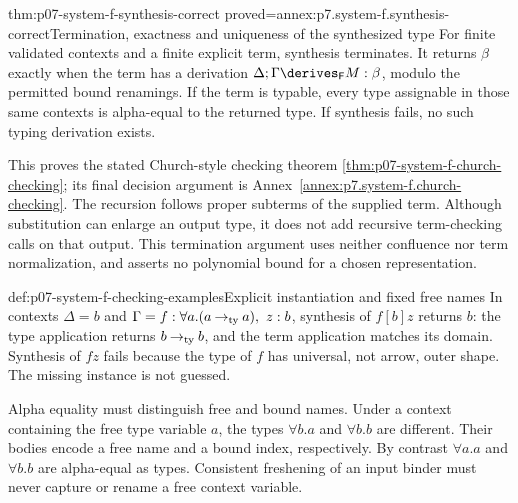 \begin{hbtheorem}{thm:p07-system-f-synthesis-correct}
 {proved=annex:p7.system-f.synthesis-correct}{Termination, exactness and uniqueness of the synthesized type}
For finite validated contexts and a finite explicit term, synthesis
terminates. It returns \(\beta\) exactly when the term has a derivation
\(\Delta;\Gamma\derives_{\mathsf F}M:\beta\), modulo the permitted
bound renamings. If the term is typable, every type assignable in those
same contexts is alpha-equal to the returned type. If synthesis fails,
no such typing derivation exists.
\end{hbtheorem}

This proves the stated Church-style checking theorem
\ref{thm:p07-system-f-church-checking}; its final decision argument is
Annex~\ref{annex:p7.system-f.church-checking}. The recursion follows
proper subterms of the supplied term. Although substitution can enlarge
an output type, it does not add recursive term-checking calls on that
output. This termination argument uses neither confluence nor term
normalization, and asserts no polynomial bound for a chosen representation.

\begin{hbexample}{def:p07-system-f-checking-examples}{Explicit instantiation and fixed free names}
In contexts \(\Delta=b\) and
\(\Gamma=f:\forall a.(a\mathbin{\to_{\rm ty}}a),\ z:b\),
synthesis of \(f[b]z\) returns \(b\): the type application returns
\(b\mathbin{\to_{\rm ty}}b\), and the term application matches
its domain. Synthesis of \(fz\) fails because the type of \(f\) has
universal, not arrow, outer shape. The missing instance is not guessed.

Alpha equality must distinguish free and bound names. Under a context
containing the free type variable \(a\), the types \(\forall b.a\)
and \(\forall b.b\) are different. Their bodies encode a free name
and a bound index, respectively. By contrast \(\forall a.a\) and
\(\forall b.b\) are alpha-equal as types. Consistent freshening of
an input binder must never capture or rename a free context variable.
\end{hbexample}
